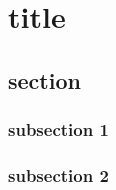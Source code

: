 \chapter{title}

\begin{introduction}

\end{introduction}

\section{section}

\subsection{subsection 1}

\subsection{subsection 2}

\cite{cn1}
